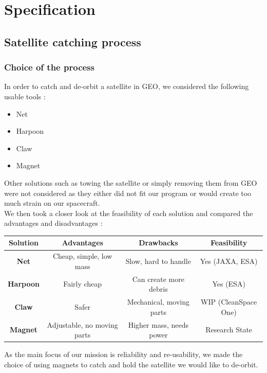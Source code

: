 \chapter{Specification}
\section{Satellite catching process}
\subsection{Choice of the process}

\qquad In order to catch and de-orbit a satellite in GEO, we considered the following usable tools :
\begin{itemize}
	\item Net
	\item Harpoon
	\item Claw
	\item Magnet
\end{itemize}

Other solutions such as towing the satellite or simply removing them from GEO were not considered as they either did not fit our program or would create too much strain on our spacecraft.\\

We then took a closer look at the feasibility of each solution and compared the advantages and disadvantages :
\begin{center}
	\begin{tabular}[H]{|c|c|c|c|}
		\hline
		\textbf{Solution} & \textbf{Advantages} & \textbf{Drawbacks} & \textbf{Feasibility}\\
		\hline
		\textbf{Net} & Cheap, simple, low mass &Slow, hard to handle & Yes (JAXA, ESA)\\
		\hline
		\textbf{Harpoon} & Fairly cheap & Can create more debris& Yes (ESA)\\
		\hline
		\textbf{Claw} & Safer & Mechanical, moving parts& WIP (CleanSpace One)\\
		\hline
		\textbf{Magnet} &Adjustable, no moving parts & Higher mass, needs power& Research State\\
		\hline
	\end{tabular}
\end{center}

As the main focus of our mission is reliability and re-usability, we made the choice of using magnets to catch and hold the satellite we would like to de-orbit.

